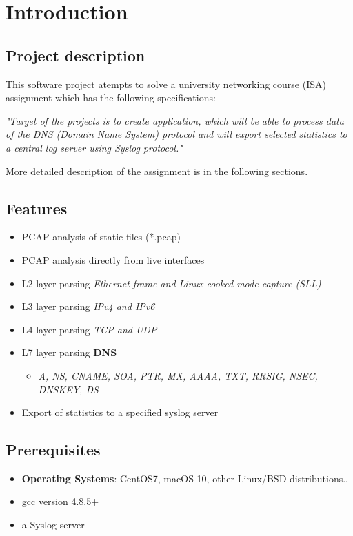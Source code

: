 

\section{Introduction}

\subsection{Project description}

This software project atempts to solve a university networking course (ISA) assignment
which has the following specifications:

\textit{"Target of the projects is to create application, which will be able to process data of the DNS (Domain Name System)
protocol and will export selected statistics to a central log server using Syslog protocol."}

More detailed description of the assignment is in the following sections.

\subsection{Features}

\begin{itemize}
\item PCAP analysis of static files (*.pcap)
\item PCAP analysis directly from live interfaces
\item L2 layer parsing \textit{Ethernet frame and Linux cooked-mode capture (SLL)}
\item L3 layer parsing \textit{IPv4 and IPv6}
\item L4 layer parsing \textit{TCP and UDP}
\item L7 layer parsing \textbf{DNS}
    \begin{itemize}
    \item \textit{A, NS, CNAME, SOA, PTR, MX, AAAA, TXT, RRSIG, NSEC, DNSKEY, DS}
    \end{itemize}
\item Export of statistics to a specified syslog server
\end{itemize} 
\subsection{Prerequisites}

\begin{itemize}

\item \textbf{Operating Systems}: CentOS7, macOS 10, other Linux/BSD distributions..
\item gcc version 4.8.5+
\item a Syslog server

\end{itemize}


